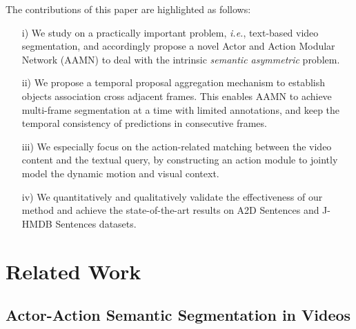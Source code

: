 \documentclass[journal]{IEEEtran}
\begin{document}
The contributions of this paper are highlighted as follows:
\begin{itemize}
    \item [i)]
    We study on a practically important problem, \emph{i.e.}, text-based video segmentation, and accordingly propose a novel Actor and Action Modular Network (AAMN) to deal with the intrinsic \emph{semantic asymmetric} problem.
    \item [ii)]
    We propose a temporal proposal aggregation mechanism to establish objects association cross adjacent frames. This enables AAMN to achieve multi-frame segmentation at a time with limited annotations, and keep the temporal consistency of predictions in consecutive frames.
    \item [iii)]
    We especially focus on the action-related matching between the video content and the textual query, by constructing an action module to jointly model the dynamic motion and visual context.
    \item [iv)]
    We quantitatively and qualitatively validate the effectiveness of our method and achieve the state-of-the-art results on A2D Sentences and J-HMDB Sentences datasets.
\end{itemize}


\section{Related Work}
\subsection{Actor-Action Semantic Segmentation in Videos}
\end{document}
